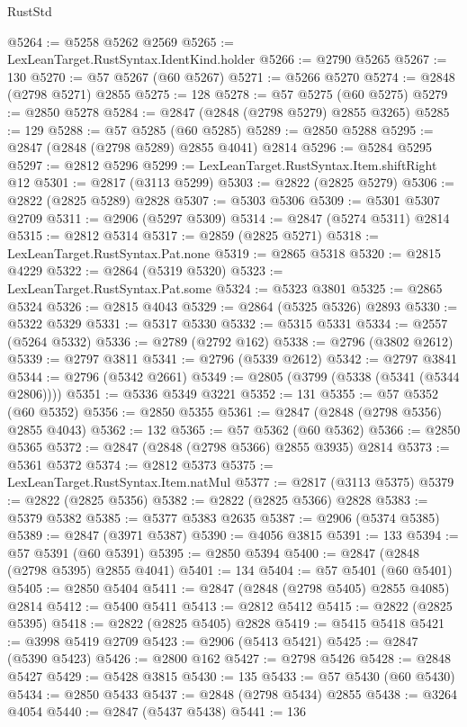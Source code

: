 \begin{lexlean}{RustStd}
\begin{coremodule}
@5264 := @5258 @5262 @2569
@5265 := LexLeanTarget.RustSyntax.IdentKind.holder
@5266 := @2790 @5265
@5267 := 130
@5270 := @57 @5267 (@60 @5267)
@5271 := @5266 @5270
@5274 := @2848 (@2798 @5271) @2855
@5275 := 128
@5278 := @57 @5275 (@60 @5275)
@5279 := @2850 @5278
@5284 := @2847 (@2848 (@2798 @5279) @2855 @3265)
@5285 := 129
@5288 := @57 @5285 (@60 @5285)
@5289 := @2850 @5288
@5295 := @2847 (@2848 (@2798 @5289) @2855 @4041) @2814
@5296 := @5284 @5295
@5297 := @2812 @5296
@5299 := LexLeanTarget.RustSyntax.Item.shiftRight @12
@5301 := @2817 (@3113 @5299)
@5303 := @2822 (@2825 @5279)
@5306 := @2822 (@2825 @5289) @2828
@5307 := @5303 @5306
@5309 := @5301 @5307 @2709
@5311 := @2906 (@5297 @5309)
@5314 := @2847 (@5274 @5311) @2814
@5315 := @2812 @5314
@5317 := @2859 (@2825 @5271)
@5318 := LexLeanTarget.RustSyntax.Pat.none
@5319 := @2865 @5318
@5320 := @2815 @4229
@5322 := @2864 (@5319 @5320)
@5323 := LexLeanTarget.RustSyntax.Pat.some
@5324 := @5323 @3801
@5325 := @2865 @5324
@5326 := @2815 @4043
@5329 := @2864 (@5325 @5326) @2893
@5330 := @5322 @5329
@5331 := @5317 @5330
@5332 := @5315 @5331
@5334 := @2557 (@5264 @5332)
@5336 := @2789 (@2792 @162)
@5338 := @2796 (@3802 @2612)
@5339 := @2797 @3811
@5341 := @2796 (@5339 @2612)
@5342 := @2797 @3841
@5344 := @2796 (@5342 @2661)
@5349 := @2805 (@3799 (@5338 (@5341 (@5344 @2806))))
@5351 := @5336 @5349 @3221
@5352 := 131
@5355 := @57 @5352 (@60 @5352)
@5356 := @2850 @5355
@5361 := @2847 (@2848 (@2798 @5356) @2855 @4043)
@5362 := 132
@5365 := @57 @5362 (@60 @5362)
@5366 := @2850 @5365
@5372 := @2847 (@2848 (@2798 @5366) @2855 @3935) @2814
@5373 := @5361 @5372
@5374 := @2812 @5373
@5375 := LexLeanTarget.RustSyntax.Item.natMul
@5377 := @2817 (@3113 @5375)
@5379 := @2822 (@2825 @5356)
@5382 := @2822 (@2825 @5366) @2828
@5383 := @5379 @5382
@5385 := @5377 @5383 @2635
@5387 := @2906 (@5374 @5385)
@5389 := @2847 (@3971 @5387)
@5390 := @4056 @3815
@5391 := 133
@5394 := @57 @5391 (@60 @5391)
@5395 := @2850 @5394
@5400 := @2847 (@2848 (@2798 @5395) @2855 @4041)
@5401 := 134
@5404 := @57 @5401 (@60 @5401)
@5405 := @2850 @5404
@5411 := @2847 (@2848 (@2798 @5405) @2855 @4085) @2814
@5412 := @5400 @5411
@5413 := @2812 @5412
@5415 := @2822 (@2825 @5395)
@5418 := @2822 (@2825 @5405) @2828
@5419 := @5415 @5418
@5421 := @3998 @5419 @2709
@5423 := @2906 (@5413 @5421)
@5425 := @2847 (@5390 @5423)
@5426 := @2800 @162
@5427 := @2798 @5426
@5428 := @2848 @5427
@5429 := @5428 @3815
@5430 := 135
@5433 := @57 @5430 (@60 @5430)
@5434 := @2850 @5433
@5437 := @2848 (@2798 @5434) @2855
@5438 := @3264 @4054
@5440 := @2847 (@5437 @5438)
@5441 := 136

\end{coremodule}
\end{lexlean}
